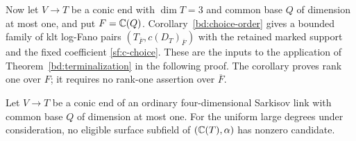 Now let $V\to T$ be a conic end with $\dim T=3$ and
common base $Q$ of dimension at most one, and put $F=\mathbb C(Q)$.
Corollary~\ref{bd:choice-order} gives a bounded family of klt log-Fano
pairs $(T_{\overline F},c(D_T)_{\overline F})$ with the retained marked
support and the fixed coefficient \eqref{sf:c-choice}.  These are the
inputs to the application of Theorem~\ref{bd:terminalization} in the
following proof.  The corollary proves
rank one over $F$; it requires no rank-one assertion over $\overline F$.

\begin{proposition}\label{sf:conic-end}
Let $V\to T$ be a conic end of an ordinary four-dimensional Sarkisov
link with common base $Q$ of dimension at most one.  For the uniform
large degrees under consideration, no eligible surface subfield of
$(\mathbb C(T),\alpha)$ has nonzero candidate.
\end{proposition}

